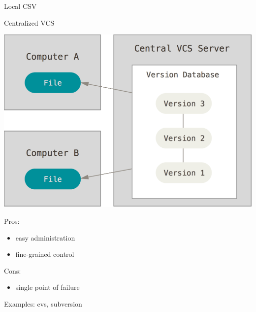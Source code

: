 \documentclass{beamer}
\begin{document}
\begin{frame}[fragile]
\begin{overprint}
\begin{block}{Local CSV}
    \end{block}

    \begin{block}{Centralized VCS}
      \begin{minipage}{.5\linewidth}
        \includegraphics[width=\textwidth]{centralized}
      \end{minipage}
      \begin{minipage}{.45\linewidth}\small
        Pros:
        \begin{itemize}
          \item easy administration
          \item fine-grained control
        \end{itemize}
        Cons:
        \begin{itemize}
          \item single point of failure
        \end{itemize}
        Examples: cvs, subversion
      \end{minipage}
    \end{block}


\end{overprint}
\end{frame}
\end{document}
